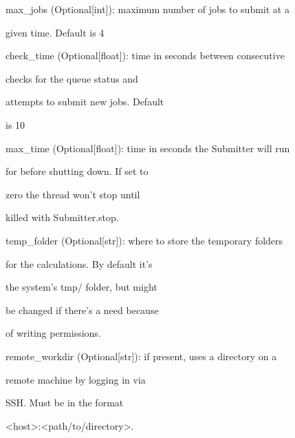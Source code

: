 \documentclass[letterpaper,10pt,english]{sphinxmanual}
\begin{document}
\begin{fulllineitems}
\begin{DUlineblock}{0em}
\begin{DUlineblock}{\DUlineblockindent}
\item[] max\_jobs (Optional{[}int{]}): maximum number of jobs to submit at a
\item[]
\begin{DUlineblock}{\DUlineblockindent}
\item[] given time. Default is 4
\end{DUlineblock}
\item[] check\_time (Optional{[}float{]}): time in seconds between consecutive
\item[]
\begin{DUlineblock}{\DUlineblockindent}
\item[] checks for the queue status and
\item[] attempts to submit new jobs. Default
\item[] is 10
\end{DUlineblock}
\item[] max\_time (Optional{[}float{]}): time in seconds the Submitter will run
\item[]
\begin{DUlineblock}{\DUlineblockindent}
\item[] for before shutting down. If set to
\item[] zero the thread won't stop until
\item[] killed with Submitter.stop.
\end{DUlineblock}
\item[] temp\_folder (Optional{[}str{]}): where to store the temporary folders
\item[]
\begin{DUlineblock}{\DUlineblockindent}
\item[] for the calculations. By default it's
\item[] the system's tmp/ folder, but might
\item[] be changed if there's a need because
\item[] of writing permissions.
\end{DUlineblock}
\item[] remote\_workdir (Optional{[}str{]}): if present, uses a directory on a
\item[]
\begin{DUlineblock}{\DUlineblockindent}
\item[] remote machine by logging in via
\item[] SSH. Must be in the format
\item[] \textless{}host\textgreater{}:\textless{}path/to/directory\textgreater{}.

\end{DUlineblock}
\end{DUlineblock}
\end{DUlineblock}
\end{fulllineitems}
\end{document}
